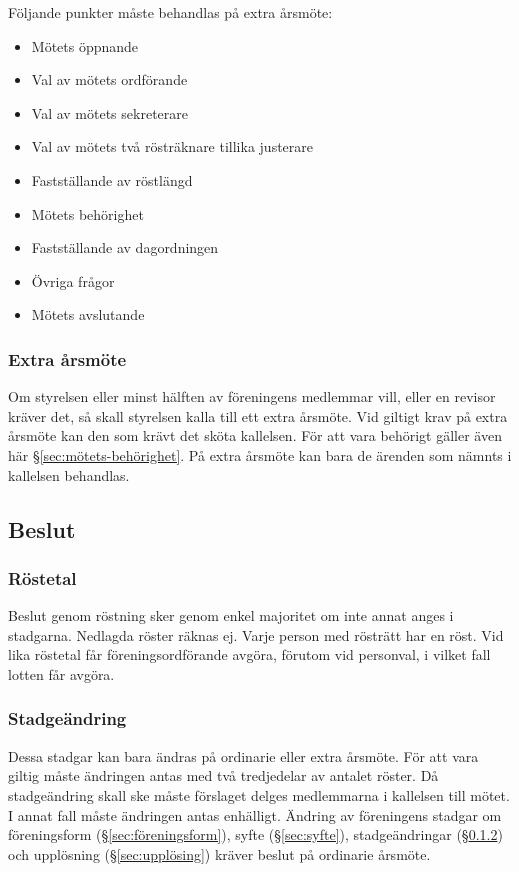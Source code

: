 Följande punkter måste behandlas på extra årsmöte:
\begin{itemize}
    \item Mötets öppnande
    \item Val av mötets ordförande
    \item Val av mötets sekreterare
    \item Val av mötets två rösträknare tillika justerare
    \item Fastställande av röstlängd
    \item Mötets behörighet
    \item Fastställande av dagordningen
    \item Övriga frågor
    \item Mötets avslutande
\end{itemize}

\subsubsection{Extra årsmöte}
Om styrelsen eller minst hälften av föreningens medlemmar vill, eller en revisor kräver det, så skall styrelsen kalla till ett extra årsmöte. Vid giltigt krav på extra årsmöte kan den som krävt det sköta kallelsen. För att vara behörigt gäller även här §\ref{sec:mötets-behörighet}. På extra årsmöte kan bara de ärenden som nämnts i kallelsen behandlas.

\subsection{Beslut}

\subsubsection{Röstetal}
Beslut genom röstning sker genom enkel majoritet om inte annat anges i stadgarna. Nedlagda röster räknas ej. Varje person med rösträtt har en röst. Vid lika röstetal får föreningsordförande avgöra, förutom vid personval, i vilket fall lotten får avgöra.

\subsubsection{Stadgeändring} \label{sec:stadgeändringar}
Dessa stadgar kan bara ändras på ordinarie eller extra årsmöte. För att vara giltig måste ändringen antas med två tredjedelar av antalet röster. Då stadgeändring skall ske måste förslaget delges medlemmarna i kallelsen till mötet. I annat fall måste ändringen antas enhälligt. Ändring av föreningens stadgar om föreningsform (§\ref{sec:föreningsform}), syfte (§\ref{sec:syfte}), stadgeändringar (§\ref{sec:stadgeändringar}) och upplösning (§\ref{sec:upplösing}) kräver beslut på ordinarie årsmöte.

